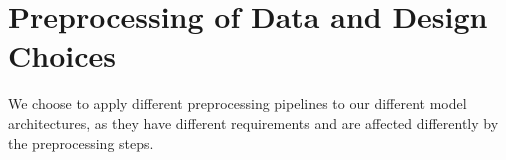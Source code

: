 \documentclass[10pt]{article} %
\begin{document}

\section{Preprocessing of Data and Design Choices}
We choose to apply different preprocessing pipelines to our different model architectures, as they have different requirements and are affected differently by the preprocessing steps.
\end{document}
